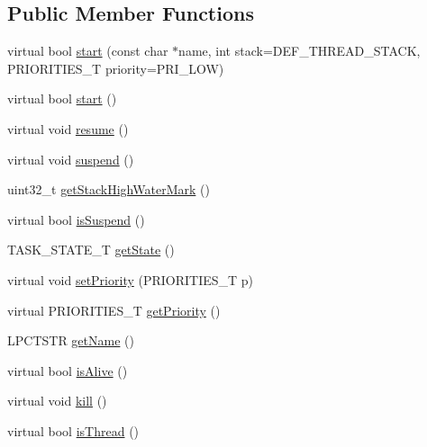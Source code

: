 \subsection*{Public Member Functions}
\begin{DoxyCompactItemize}
\item 
virtual bool \hyperlink{class_c_thread_a3ebabcc071634508511ae2fc7b868ab7}{start} (const char $\ast$name, int stack=D\-E\-F\-\_\-\-T\-H\-R\-E\-A\-D\-\_\-\-S\-T\-A\-C\-K, P\-R\-I\-O\-R\-I\-T\-I\-E\-S\-\_\-\-T priority=P\-R\-I\-\_\-\-L\-O\-W)
\item 
virtual bool \hyperlink{class_c_thread_aacf955d1852e74da1f989251955ee6ec}{start} ()
\item 
virtual void \hyperlink{class_c_thread_ac8c53aa8c145fc4ac70fa6d825b95742}{resume} ()
\item 
virtual void \hyperlink{class_c_thread_a53e71e6db2221cd1c45aec21953d4aad}{suspend} ()
\item 
uint32\-\_\-t \hyperlink{class_c_thread_ac0227eda51725b795a461a768703f588}{get\-Stack\-High\-Water\-Mark} ()
\item 
virtual bool \hyperlink{class_c_thread_a51dbe9909ce528b4113d2cc27314e965}{is\-Suspend} ()
\item 
T\-A\-S\-K\-\_\-\-S\-T\-A\-T\-E\-\_\-\-T \hyperlink{class_c_thread_a1e9cce461d8dfb3889cea24f1a703f6f}{get\-State} ()
\item 
virtual void \hyperlink{class_c_thread_a6b0703ae0cc085a0c0aaa55b6945575b}{set\-Priority} (P\-R\-I\-O\-R\-I\-T\-I\-E\-S\-\_\-\-T p)
\item 
virtual P\-R\-I\-O\-R\-I\-T\-I\-E\-S\-\_\-\-T \hyperlink{class_c_thread_ac30b0a1f51549a97b88771692319c0e4}{get\-Priority} ()
\item 
L\-P\-C\-T\-S\-T\-R \hyperlink{class_c_thread_aa291909bc3ff7cc0decf46c885a7a725}{get\-Name} ()
\item 
virtual bool \hyperlink{class_c_thread_a4a0f0727be4714cef1e24150a869d403}{is\-Alive} ()
\item 
virtual void \hyperlink{class_c_thread_a15041136818470124d097d790d55a6e5}{kill} ()
\item 
virtual bool \hyperlink{class_c_thread_ab2513fd0fcad30e2e6605609c91f1984}{is\-Thread} ()
\end{DoxyCompactItemize}
